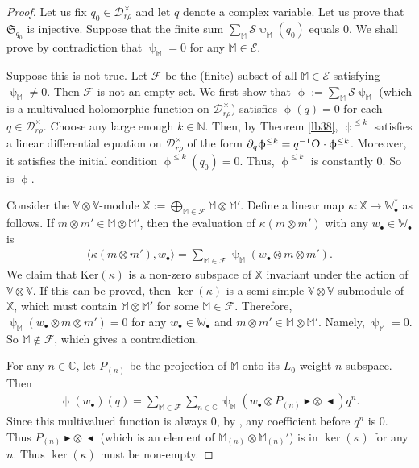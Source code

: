 \documentclass[11pt,b5paper,notitlepage]{article}
\theoremstyle{definition}
\theoremstyle{plain}
\newcommand{\fk}{\mathfrak}
\newcommand{\mc}{\mathcal}
\newcommand{\bk}[1]{\langle {#1}\rangle}
\newcommand{\mbb}{\mathbb}
\newcommand{\blt}{\bullet}
\newcommand{\Vbb}{\mathbb V}
\newcommand{\Wbb}{\mathbb W}
\newcommand{\Mbb}{\mathbb M}
\newcommand{\Cbb}{\mathbb C}
\newcommand{\Nbb}{\mathbb N}
\newcommand{\btl}{\blacktriangleleft}
\newcommand{\btr}{\blacktriangleright}
\newcommand{\Ker}{\mathrm{Ker}}
\numberwithin{equation}{section}
\begin{document}
\begin{proof}
	Let us fix $q_0\in\mc D_{r\rho}^\times$ and let $q$ denote a complex variable. Let us prove that $\fk S_{q_0}$ is injective. Suppose that the finite sum $\sum_\Mbb\mc S\uppsi_\Mbb(q_0)$ equals $0$. We shall prove by contradiction that $\uppsi_\Mbb=0$ for any $\Mbb\in\mc E$. 
	
	Suppose this is not true. Let $\mc F$ be the (finite) subset of all $\Mbb\in\mc E$ satisfying $\uppsi_\Mbb\neq0$. Then $\mc F$ is not an empty set. 	We first show that $\upphi:=\sum_\Mbb\mc S\uppsi_\Mbb$ (which is a multivalued holomorphic function on $\mc D_{r\rho}^\times$) satisfies $\upphi(q)=0$ for each $q\in\mc D_{r\rho}^\times$. Choose any large enough  $k\in\Nbb$. Then, by Theorem \ref{lb38},  $\upphi^{\leq k}$ satisfies a linear differential equation on $\mc D_{r\rho}^\times$ of the form $\partial_q\upphi^{\leq k}=q^{-1}\Upomega\cdot \upphi^{\leq k}$. Moreover, it satisfies the initial condition $\upphi^{\leq k}(q_0)=0$. Thus, $\upphi^{\leq k}$ is constantly $0$. So is $\upphi$.
	
	Consider the $\Vbb\otimes\Vbb$-module $\mbb X:=\bigoplus_{\Mbb\in\mc F}\Mbb\otimes\Mbb'$. Define a linear map $\kappa:\mbb X\rightarrow \Wbb_\blt^*$ as follows. If $m\otimes m'\in\Mbb\otimes\Mbb'$, then the evaluation of $\kappa(m\otimes m')$ with any $w_\blt\in\Wbb_\blt$ is
	\begin{align*}
	\bk{\kappa(m\otimes m'),w_\blt}=\sum_{\Mbb\in\mc F}\uppsi_\Mbb(w_\blt\otimes m\otimes m').
	\end{align*}
	We claim that $\Ker(\kappa)$ is a non-zero subspace of $\mbb X$ invariant under the action of $\Vbb\otimes \Vbb$. If this can be proved, then $\ker(\kappa)$ is a semi-simple $\Vbb\otimes\Vbb$-submodule of $\mbb X$, which must contain $\Mbb\otimes\Mbb'$ for some $\Mbb\in\mc F$. Therefore, $\uppsi_\Mbb(w_\blt\otimes m\otimes m')=0$ for any $w_\blt\in\Wbb_\blt$ and $m\otimes m'\in\Mbb\otimes\Mbb'$. Namely, $\uppsi_\Mbb=0$. So $\Mbb\notin\mc F$, which gives a contradiction. 
	
	For any $n\in\Cbb$, let $P_{(n)}$ be the projection of $\Mbb$ onto its $L_0$-weight $n$ subspace. Then 
	\begin{align*}
	\upphi(w_\blt)(q)=\sum_{\Mbb\in\mc F}\sum_{n\in\Cbb} \uppsi_\Mbb(w_\blt\otimes P_{(n)}\btr\otimes~\btl)q^n.
	\end{align*}
	Since this multivalued function is always $0$, by \cite[Prop. 2.1]{Hua17}, any coefficient before $q^n$ is $0$. Thus $P_{(n)}\btr\otimes~\btl$ (which is an element of $\Mbb_{(n)}\otimes\Mbb_{(n)}'$) is in $\ker(\kappa)$ for any $n$. Thus $\ker(\kappa)$ must be non-empty.
	

\end{proof}
\end{document}
